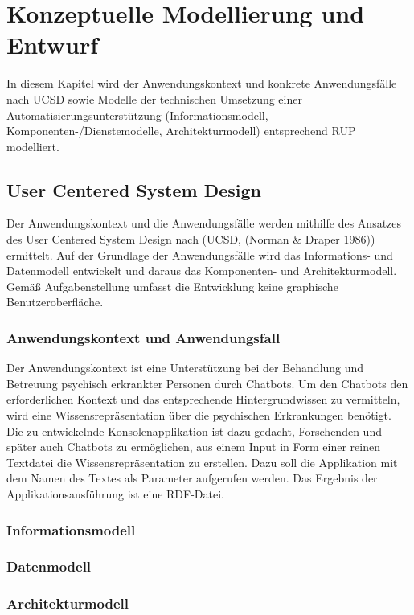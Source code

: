 \chapter{Konzeptuelle Modellierung und Entwurf}
\label{ch:modellierung}
In diesem Kapitel wird der Anwendungskontext und konkrete Anwendungsfälle nach UCSD sowie Modelle der technischen Umsetzung einer Automatisierungsunterstützung (Informationsmodell, Komponenten-/Dienstemodelle, Architekturmodell) entsprechend RUP modelliert.

\section{User Centered System Design }

Der Anwendungskontext und die Anwendungsfälle werden mithilfe des Ansatzes des User Centered System Design nach (UCSD, (Norman & Draper 1986)) ermittelt. Auf der Grundlage der Anwendungsfälle wird das Informations- und Datenmodell entwickelt und daraus das Komponenten- und Architekturmodell.
Gemäß Aufgabenstellung umfasst die Entwicklung keine graphische Benutzeroberfläche.

\subsection{Anwendungskontext und Anwendungsfall}

Der Anwendungskontext ist eine Unterstützung bei der Behandlung und Betreuung psychisch erkrankter Personen durch Chatbots. Um den Chatbots den erforderlichen Kontext und das entsprechende Hintergrundwissen zu vermitteln, wird eine Wissensrepräsentation über die psychischen Erkrankungen benötigt. Die zu entwickelnde Konsolenapplikation ist dazu gedacht, Forschenden und später auch Chatbots zu ermöglichen, aus einem Input in Form einer reinen Textdatei die Wissensrepräsentation zu erstellen. Dazu soll die Applikation mit dem Namen des Textes als Parameter aufgerufen werden. Das Ergebnis der Applikationsausführung ist eine RDF-Datei.

\subsection{Informationsmodell}

\subsection{Datenmodell}

\subsection{Architekturmodell}


